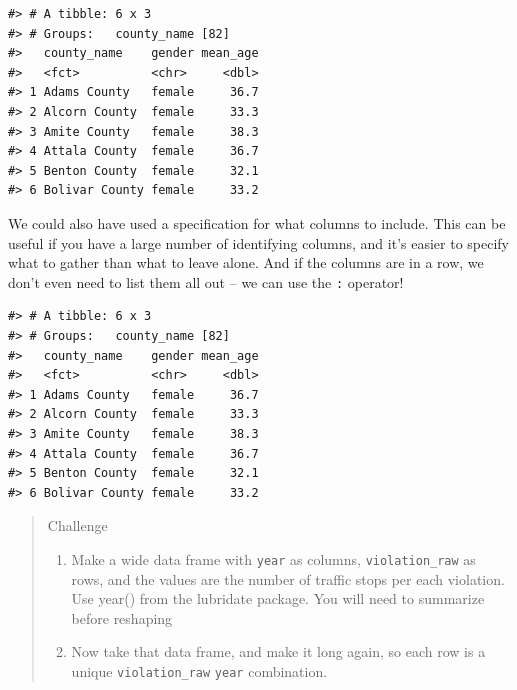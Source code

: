 \documentclass[]{book}
\newenvironment{Shaded}{\begin{snugshade}}{\end{snugshade}}
\newcommand{\KeywordTok}[1]{\textcolor[rgb]{0.13,0.29,0.53}{\textbf{#1}}}
\newcommand{\NormalTok}[1]{#1}
\newcommand{\OperatorTok}[1]{\textcolor[rgb]{0.81,0.36,0.00}{\textbf{#1}}}
\newcommand{\StringTok}[1]{\textcolor[rgb]{0.31,0.60,0.02}{#1}}
\begin{document}
\begin{Shaded}
\end{Shaded}

\begin{verbatim}
#> # A tibble: 6 x 3
#> # Groups:   county_name [82]
#>   county_name    gender mean_age
#>   <fct>          <chr>     <dbl>
#> 1 Adams County   female     36.7
#> 2 Alcorn County  female     33.3
#> 3 Amite County   female     38.3
#> 4 Attala County  female     36.7
#> 5 Benton County  female     32.1
#> 6 Bolivar County female     33.2
\end{verbatim}

We could also have used a specification for what columns to include. This can be
useful if you have a large number of identifying columns, and it's easier to
specify what to gather than what to leave alone. And if the columns are in a
row, we don't even need to list them all out -- we can use the \texttt{:} operator!

\begin{Shaded}
\end{Shaded}

\begin{verbatim}
#> # A tibble: 6 x 3
#> # Groups:   county_name [82]
#>   county_name    gender mean_age
#>   <fct>          <chr>     <dbl>
#> 1 Adams County   female     36.7
#> 2 Alcorn County  female     33.3
#> 3 Amite County   female     38.3
#> 4 Attala County  female     36.7
#> 5 Benton County  female     32.1
#> 6 Bolivar County female     33.2
\end{verbatim}

\begin{quote}
Challenge

\begin{enumerate}
\def\labelenumi{\arabic{enumi}.}
\item
  Make a wide data frame with \texttt{year} as columns, \texttt{violation\_raw} as rows, and the values are the number of traffic stops per each violation. Use year() from the lubridate package. You will need to summarize before reshaping
\item
  Now take that data frame, and make it long again, so each row is a unique
  \texttt{violation\_raw} \texttt{year} combination.
\end{enumerate}
\end{quote}
\end{document}
